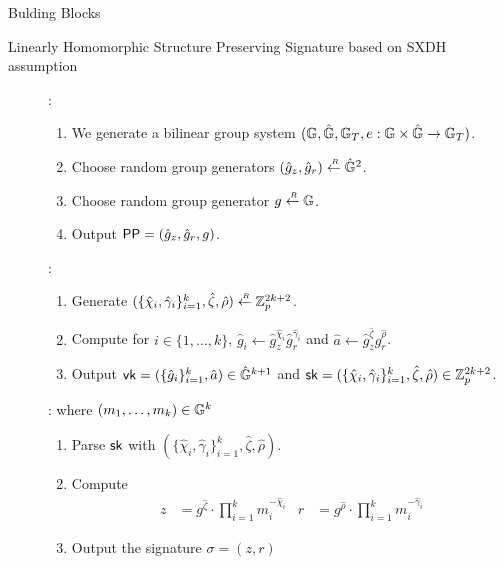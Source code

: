 \begin{subsection}{Bulding Blocks}

  \begin{myDef}{Linearly Homomorphic Structure Preserving Signature based on SXDH assumption}
    \begin{description}
    \item[]:
      \begin{enumerate}
      \item We generate a bilinear group system $(\mathbb{G}, \hat{\mathbb{G}}, \mathbb{G}_T, e:\mathbb{G} \times \hat{\mathbb{G}} \to \mathbb{G}_T)$.
      \item Choose random group generators $(\hat{g}_z, \hat{g}_r) \stackrel{{\scriptscriptstyle \mkern4mu R}}{\gets} \hat{\mathbb{G}}^2$.
      \item Choose random group generator $g \stackrel{{\scriptscriptstyle \mkern4mu R}}{\gets} \mathbb{G}$.
      \item Output $\mathsf{PP} = (\hat{g}_z, \hat{g}_r, g)$.
      \end{enumerate}
    \item[]:
      \begin{enumerate}
      \item Generate $(\{\hat{\chi}_i, \hat{\gamma}_i\}_{i =1 }^k, \hat{\zeta}, \hat{\rho}) \stackrel{{\scriptscriptstyle \mkern4mu R}}{\gets} \mathbb{Z}_p^{2k+2}$.
      \item Compute for $i \in \{1, \dots, k\}$, $\hat{g}_i \gets \hat{g}_z^{\hat{\chi}_i}\hat{g}_r^{\hat{\gamma}_i}$ and $\hat{a} \gets \hat{g}_z^{\hat{\zeta}}\hat{g}_r^{\hat{\rho}}$.
      \item Output $\mathsf{vk} = (\{\hat{g}_i\}_{i=1}^k, \hat{a}) \in \hat{\mathbb{G}}^{k+1}$ and $\mathsf{sk} = (\{\hat{\chi}_i, \hat{\gamma}_i\}_{i=1}^k, \hat{\zeta}, \hat{\rho}) \in \mathbb{Z}_p^{2k+2}$.
      \end{enumerate}
    \item[]: where $(m_1, \dots, m_k) \in \mathbb{G}^k$
      \begin{enumerate}
      \item Parse $\mathsf{sk}$ with $(\{\hat{\chi}_i, \hat{\gamma}_i\}_{i = 1}^k, \hat{\zeta}, \hat{\rho})$.
      \item Compute
        \begin{align*}
          z &= g^{\hat{\zeta}} \cdot \prod_{i=1}^km_i^{-\hat{\chi}_i} & r &= g^{\hat{\rho}} \cdot \prod_{i =1}^km_i^{-\hat{\gamma}_i} 
        \end{align*}
      \item Output the signature $\sigma = (z, r)$
      \end{enumerate}


\end{description}
\end{myDef}
\end{subsection}
